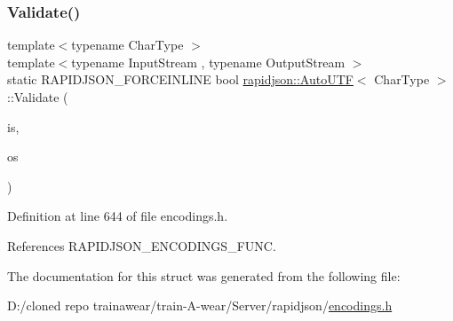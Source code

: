 \subsubsection{\texorpdfstring{Validate()}{Validate()}}
{\footnotesize\ttfamily template$<$typename Char\+Type $>$ \\
template$<$typename Input\+Stream , typename Output\+Stream $>$ \\
static R\+A\+P\+I\+D\+J\+S\+O\+N\+\_\+\+F\+O\+R\+C\+E\+I\+N\+L\+I\+NE bool \mbox{\hyperlink{structrapidjson_1_1_auto_u_t_f}{rapidjson\+::\+Auto\+U\+TF}}$<$ Char\+Type $>$\+::Validate (\begin{DoxyParamCaption}\item[{Input\+Stream \&}]{is,  }\item[{Output\+Stream \&}]{os }\end{DoxyParamCaption})\hspace{0.3cm}{\ttfamily [static]}}



Definition at line 644 of file encodings.\+h.


\begin{DoxyCode}{0}

\end{DoxyCode}


References R\+A\+P\+I\+D\+J\+S\+O\+N\+\_\+\+E\+N\+C\+O\+D\+I\+N\+G\+S\+\_\+\+F\+U\+NC.



The documentation for this struct was generated from the following file\+:\begin{DoxyCompactItemize}
\item 
D\+:/cloned repo trainawear/train-\/\+A-\/wear/\+Server/rapidjson/\mbox{\hyperlink{encodings_8h}{encodings.\+h}}\end{DoxyCompactItemize}
